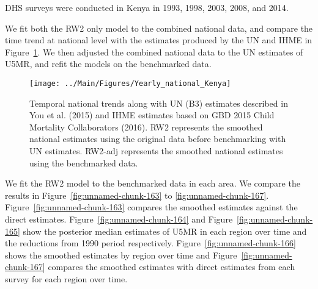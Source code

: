 \documentclass[12pt]{article}\usepackage[]{graphicx}\usepackage[]{color}
\newenvironment{knitrout}{}{} %
\begin{document}


DHS surveys were conducted in Kenya in 1993, 1998, 2003, 2008, and 2014.

We fit both the RW2 only model to the combined national data, and compare the time trend at national level with the estimates produced by the UN and IHME in Figure~\ref{fig:unnamed-chunk-162}. We then adjusted the combined national data to the UN estimates of U5MR, and refit the models on the benchmarked data. 

\begin{knitrout}
\color{fgcolor}\begin{figure}[bht]

{\centering \texttt{[image: ../Main/Figures/Yearly\_national\_Kenya]} 

}

\caption[Temporal national trends along with UN (B3) estimates described in You et al]{Temporal national trends along with UN (B3) estimates described in You et al. (2015) and IHME estimates based on GBD 2015 Child Mortality Collaborators (2016). RW2 represents the smoothed national estimates using the original data before benchmarking with UN estimates. RW2-adj represents the smoothed national estimates using the benchmarked data.}\label{fig:unnamed-chunk-162}
\end{figure}


\end{knitrout}
 

We fit the RW2 model to the benchmarked data in each area. 
We compare the results in Figure~\ref{fig:unnamed-chunk-163} to \ref{fig:unnamed-chunk-167}.
Figure~\ref{fig:unnamed-chunk-163} compares the smoothed estimates against the direct estimates. Figure~\ref{fig:unnamed-chunk-164} and Figure~\ref{fig:unnamed-chunk-165} show the posterior median estimates of U5MR in each region over time and the reductions from 1990 period respectively.
Figure~\ref{fig:unnamed-chunk-166} shows the smoothed estimates by region over time and Figure~\ref{fig:unnamed-chunk-167} compares the smoothed estimates with direct estimates from each survey for each region over time.


\end{document}

